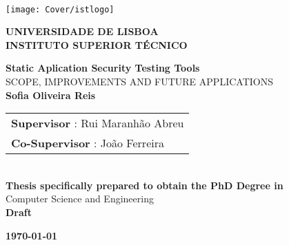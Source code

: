 \setcounter{page}{1} 


\thispagestyle{empty}
\begin{flushleft} ~\\ \vspace{-12mm} \hspace{-12mm}  \texttt{[image: Cover/istlogo]} 
 
\centering
\LARGE \textbf{UNIVERSIDADE DE LISBOA \\ INSTITUTO SUPERIOR TÉCNICO}
\vspace{30mm}

 \vspace{5mm}
 
\centering
\LARGE \textbf{Static Aplication Security Testing Tools}
\\ \vspace{10mm}
\Large SCOPE, IMPROVEMENTS AND FUTURE APPLICATIONS
\\ \vspace{15mm}
\Large \textbf{Sofia Oliveira Reis} \\
\vspace{4cm}

\begin{minipage}{\textwidth}
\begin{tabularx}{\textwidth}{ l }
\large \textbf{Supervisor} : Rui Maranhão Abreu\\
 \large \textbf{Co-Supervisor} :  João Ferreira\\
\end{tabularx}

\end{minipage}
%
\\ \vspace{27mm}
\centering
\large \textbf{Thesis specifically prepared to obtain the PhD Degree in}\\
\large Computer Science and Engineering\\
\vspace{18mm}
\Large \textbf{Draft}
 
\vspace{15mm}

\large \textbf{\todaythesis\today} \\
\let\thepage\relax
\end{flushleft}
\pagebreak
